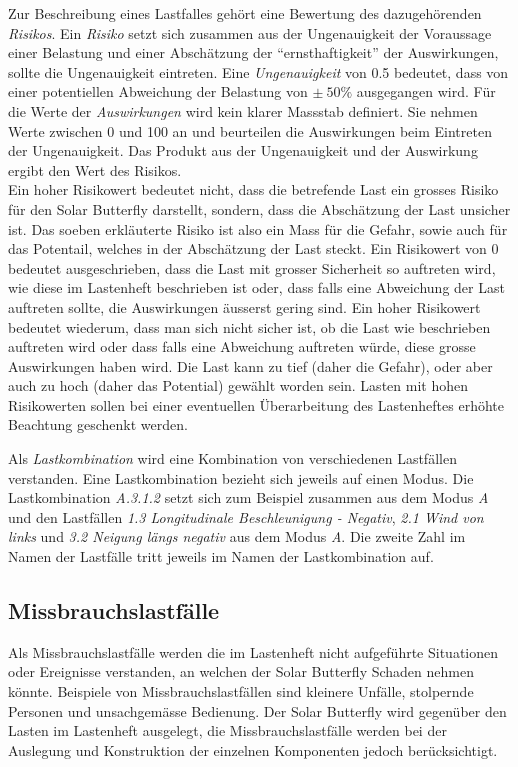 Zur Beschreibung eines Lastfalles gehört eine Bewertung des dazugehörenden \emph{Risikos}. Ein \emph{Risiko} setzt sich zusammen aus der Ungenauigkeit der Voraussage einer Belastung und einer Abschätzung der ``ernsthaftigkeit'' der Auswirkungen, sollte die Ungenauigkeit eintreten. Eine \emph{Ungenauigkeit} von 0.5 bedeutet, dass von einer potentiellen Abweichung der Belastung von $\pm\: 50\%$ ausgegangen wird. Für die Werte der \emph{Auswirkungen} wird kein klarer Massstab definiert. Sie nehmen Werte zwischen 0 und 100 an und beurteilen die Auswirkungen beim Eintreten der Ungenauigkeit. Das Produkt aus der Ungenauigkeit und der Auswirkung ergibt den Wert des Risikos.\\
Ein hoher Risikowert bedeutet nicht, dass die betrefende Last ein grosses Risiko für den Solar Butterfly darstellt, sondern, dass die Abschätzung der Last unsicher ist. Das soeben erkläuterte Risiko ist also ein Mass für die Gefahr, sowie auch für das Potentail, welches in der Abschätzung der Last steckt. Ein Risikowert von 0 bedeutet ausgeschrieben, dass die Last mit grosser Sicherheit so auftreten wird, wie diese im Lastenheft beschrieben ist oder, dass falls eine Abweichung der Last auftreten sollte, die Auswirkungen äusserst gering sind. Ein hoher Risikowert bedeutet wiederum, dass man sich nicht sicher ist, ob die Last wie beschrieben auftreten wird oder dass falls eine Abweichung auftreten würde, diese grosse Auswirkungen haben wird. Die Last kann zu tief (daher die Gefahr), oder aber auch zu hoch (daher das Potential) gewählt worden sein. Lasten mit hohen Risikowerten sollen bei einer eventuellen Überarbeitung des Lastenheftes erhöhte Beachtung geschenkt werden.

Als \emph{Lastkombination} wird eine Kombination von verschiedenen Lastfällen verstanden. Eine Lastkombination bezieht sich jeweils auf einen Modus. Die Lastkombination \emph{A.3.1.2} setzt sich zum Beispiel zusammen aus dem Modus \emph{A} und den Lastfällen \emph{1.3 Longitudinale Beschleunigung - Negativ}, \emph{2.1 Wind von links} und \emph{3.2 Neigung längs negativ} aus dem Modus \emph{A}. Die zweite Zahl im Namen der Lastfälle tritt jeweils im Namen der Lastkombination auf.

\subsection{Missbrauchslastfälle}
Als Missbrauchslastfälle werden die im Lastenheft nicht aufgeführte Situationen oder Ereignisse verstanden, an welchen der Solar Butterfly Schaden nehmen könnte. Beispiele von Missbrauchslastfällen sind kleinere Unfälle, stolpernde Personen und unsachgemässe Bedienung. Der Solar Butterfly wird gegenüber den Lasten im Lastenheft ausgelegt, die Missbrauchslastfälle werden bei der Auslegung und Konstruktion der einzelnen Komponenten jedoch berücksichtigt.

